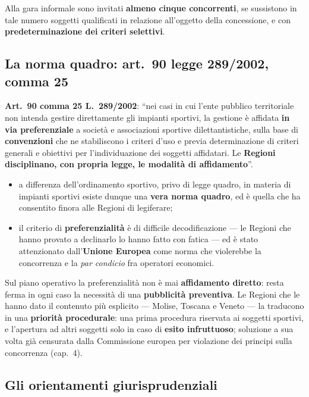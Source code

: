 Alla gara informale sono invitati \textbf{almeno cinque concorrenti}, se sussistono in tale numero
soggetti qualificati in relazione all'oggetto della concessione, e con \textbf{predeterminazione
dei criteri selettivi}.

\subsection{La norma quadro: art.\ 90 legge 289/2002, comma 25}

\textbf{Art.\ 90 comma 25 L.\ 289/2002}: ``nei casi in cui l'ente pubblico territoriale non intenda
gestire direttamente gli impianti sportivi, la gestione è affidata \textbf{in via preferenziale} a
società e associazioni sportive dilettantistiche, sulla base di \textbf{convenzioni} che ne
stabiliscono i criteri d'uso e previa determinazione di criteri generali e obiettivi per
l'individuazione dei soggetti affidatari. Le \textbf{Regioni disciplinano, con propria legge, le
modalità di affidamento}''.

\begin{itemize}
  \item a differenza dell'ordinamento sportivo, privo di legge quadro, in materia di impianti
    sportivi esiste dunque una \textbf{vera norma quadro}, ed è quella che ha consentito finora
    alle Regioni di legiferare;
  \item il criterio di \textbf{preferenzialità} è di difficile decodificazione --- le Regioni che
    hanno provato a declinarlo lo hanno fatto con fatica --- ed è stato attenzionato
    dall'\textbf{Unione Europea} come norma che violerebbe la concorrenza e la \textit{par
    condicio} fra operatori economici.
\end{itemize}

Sul piano operativo la preferenzialità non è mai \textbf{affidamento diretto}: resta ferma in ogni
caso la necessità di una \textbf{pubblicità preventiva}. Le Regioni che le hanno dato il contenuto
più esplicito --- Molise, Toscana e Veneto --- la traducono in una \textbf{priorità procedurale}:
una prima procedura riservata ai soggetti sportivi, e l'apertura ad altri soggetti solo in caso di
\textbf{esito infruttuoso}; soluzione a sua volta già censurata dalla Commissione europea per
violazione dei principi sulla concorrenza (cap.~4).

\subsection{Gli orientamenti giurisprudenziali}

